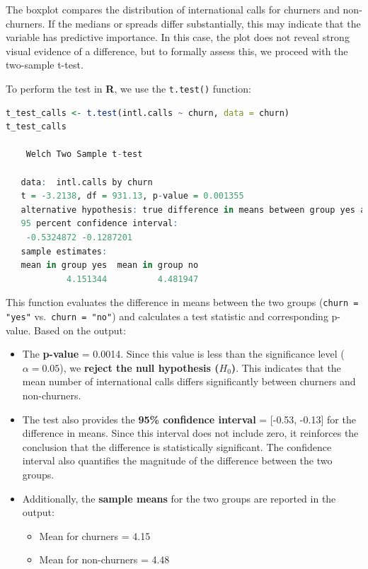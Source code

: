 \documentclass[
]{book}
\newcommand{\passthrough}[1]{#1}
\providecommand{\tightlist}{%
  \setlength{\itemsep}{0pt}\setlength{\parskip}{0pt}}
\theoremstyle{definition}
\theoremstyle{definition}
\theoremstyle{definition}
\theoremstyle{definition}
\theoremstyle{remark}
\begin{document}
The boxplot compares the distribution of international calls for churners and non-churners. If the medians or spreads differ substantially, this may indicate that the variable has predictive importance. In this case, the plot does not reveal strong visual evidence of a difference, but to formally assess this, we proceed with the two-sample t-test.

To perform the test in \textbf{R}, we use the \passthrough{\lstinline!t.test()!} function:

\begin{lstlisting}[language=R]
t_test_calls <- t.test(intl.calls ~ churn, data = churn)
t_test_calls
   
    Welch Two Sample t-test
   
   data:  intl.calls by churn
   t = -3.2138, df = 931.13, p-value = 0.001355
   alternative hypothesis: true difference in means between group yes and group no is not equal to 0
   95 percent confidence interval:
    -0.5324872 -0.1287201
   sample estimates:
   mean in group yes  mean in group no 
            4.151344          4.481947
\end{lstlisting}

This function evaluates the difference in means between the two groups (\passthrough{\lstinline!churn = "yes"!} vs.~\passthrough{\lstinline!churn = "no"!}) and calculates a test statistic and corresponding p-value. Based on the output:

\begin{itemize}
\item
  The \textbf{p-value} = 0.0014. Since this value is less than the significance level (\(\alpha = 0.05\)), we \textbf{reject the null hypothesis (\(H_0\))}. This indicates that the mean number of international calls differs significantly between churners and non-churners.
\item
  The test also provides the \textbf{95\% confidence interval} = {[}-0.53, -0.13{]} for the difference in means. Since this interval does not include zero, it reinforces the conclusion that the difference is statistically significant. The confidence interval also quantifies the magnitude of the difference between the two groups.
\item
  Additionally, the \textbf{sample means} for the two groups are reported in the output:

  \begin{itemize}
  \tightlist
  \item
    Mean for churners = 4.15\\
  \item
    Mean for non-churners = 4.48
  \end{itemize}
\end{itemize}
\end{document}
